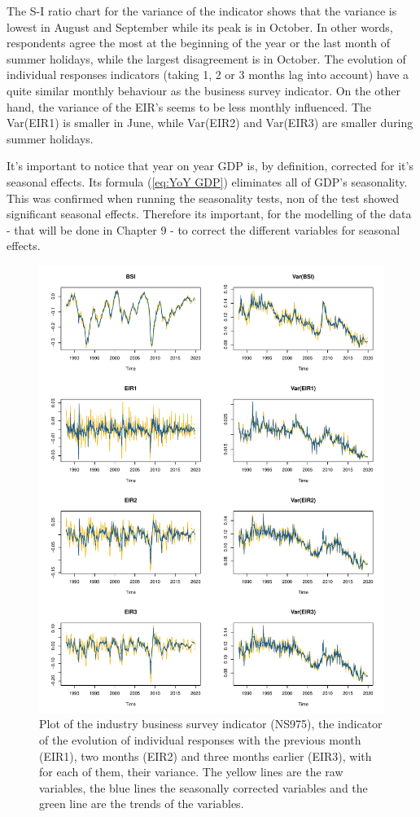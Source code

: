 \documentclass[12pt,a4paper,oneside]{book}
\begin{document}
The S-I ratio chart for the variance of the indicator shows that the variance is lowest in August and September while its peak is in October. In other words, respondents agree the most at the beginning of the year or the last month of summer holidays, while the largest disagreement is in October.
The evolution of individual responses indicators (taking 1, 2 or 3 months lag into account) have a quite similar monthly behaviour as the business survey indicator.
On the other hand, the variance of the EIR's seems to be less monthly influenced. The Var(EIR1) is smaller in June, while Var(EIR2) and Var(EIR3) are smaller during summer holidays.

It's important to notice that year on year GDP is, by definition, corrected for it's seasonal effects. Its formula (\autoref{eq:YoY GDP}) eliminates all of GDP's seasonality.
This was confirmed when running the seasonality tests, non of the test showed significant seasonal effects.
Therefore its important, for the modelling of the data - that will be done in Chapter 9 - to correct the different variables for seasonal effects.

 
\begin{figure}[htp!]
    \centering
    \includegraphics[scale=0.74]{Graphs/RJDemetra_plots.pdf}
    \caption{Plot of the industry business survey indicator (NS975), the indicator of the evolution of individual responses with the previous month (EIR1), two months (EIR2) and three months earlier (EIR3), with for each of them, their variance. The yellow lines are the raw variables, the blue lines the seasonally corrected variables and the green line are the trends of the variables.}
    \label{fig:seasonal ajusted rjdemetra}
\end{figure}
\end{document}
